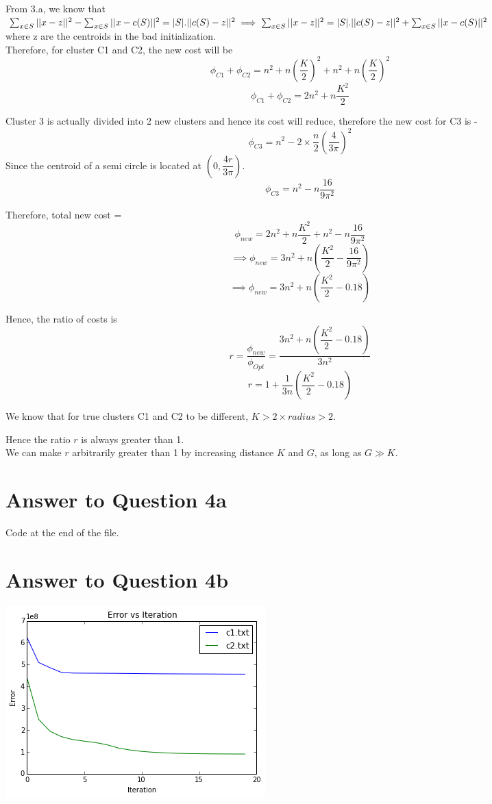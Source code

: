 \documentclass[11pt]{article}
\begin{document}
{From 3.a, we know that \\

$
\sum_{x \in S} || x - z ||^2 - \sum_{x \in S} || x - c(S)||^2 = |S| . || c(S) - z ||^2 \\ \\
\implies \sum_{x \in S} || x - z ||^2 = |S| . || c(S) - z ||^2 + \sum_{x \in S} || x - c(S)||^2
$ \\

where z are the centroids in the bad initialization. \\

Therefore, for cluster C1 and C2, the new cost will be
$$\phi_{C1} + \phi_{C2} = n^2 + n (\dfrac{K}{2})^2 + n^2 + n (\dfrac{K}{2})^2$$
$$\phi_{C1} + \phi_{C2} = 2n^2 + n \dfrac{K^2}{2} $$

Cluster 3 is actually divided into 2 new clusters and hence its cost will reduce, therefore the new cost for C3 is -
$$\phi_{C3} = n^2 - 2 \times \frac{n}{2} (\dfrac{4}{3\pi})^2$$
Since the centroid of a semi circle is located at $(0, \dfrac{4r}{3\pi})$.
$$\phi_{C3} = n^2 - n \dfrac{16}{9 \pi^2}$$

Therefore, total new cost = 
$$\phi_{new} = 2n^2 + n \dfrac{K^2}{2} + n^2 - n \dfrac{16}{9 \pi^2} $$
$$\implies \phi_{new} = 3n^2 + n (\dfrac{K^2}{2} - \dfrac{16}{9 \pi^2})  $$
$$\implies \phi_{new} = 3n^2 + n (\dfrac{K^2}{2} - 0.18)  $$

Hence, the ratio of costs is
$$ r = \dfrac{\phi_{new}}{\phi_{Opt}} = \dfrac{3n^2 + n (\dfrac{K^2}{2} - 0.18)}{3n^2}$$
$$ r = 1 + \frac{1}{3n} (\dfrac{K^2}{2} - 0.18)$$

We know that for true clusters C1 and C2 to be different, $K > 2 \times radius > 2$.

Hence the ratio $r$ is always greater than 1.\\

We can make $r$ arbitrarily greater than 1 by increasing distance $K$ and $G$, as long as $G \gg K$.

\pagebreak[4]
\section*{Answer to Question 4a}
Code at the end of the file.

\pagebreak[4]
\section*{Answer to Question 4b}
\includegraphics*{q4err}\\

}
\end{document}
